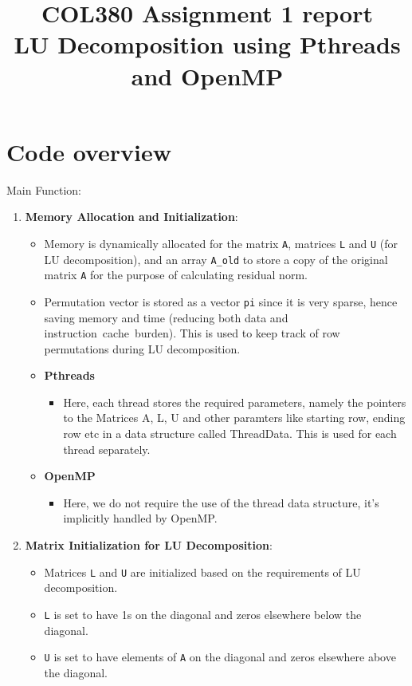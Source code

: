 \documentclass{article}
\title{COL380 Assignment 1 report \\  LU Decomposition using Pthreads and OpenMP}
\author{}
\date{}
\begin{document}
\maketitle

\section{Code overview}

Main Function:

\begin{enumerate}
    \item \textbf{Memory Allocation and Initialization}:
    \begin{itemize}
        \item Memory is dynamically allocated for the matrix \texttt{A}, matrices \texttt{L} and \texttt{U} (for LU decomposition), and an array \texttt{A\_old} to store a copy of the original matrix \texttt{A} for the purpose of calculating residual norm.
		\item Permutation vector is stored as a vector \texttt{pi} since it is very sparse, hence saving memory and time (reducing both data and instruction cache burden). This is used to keep track of row permutations during LU decomposition.
		\item \textbf{Pthreads}
		\begin{itemize}
			\item Here, each thread stores the required parameters, namely the pointers to the Matrices A, L, U and other paramters like starting row, ending row etc in a data structure called ThreadData. This is used for each thread separately.
		\end{itemize}
		\item \textbf{OpenMP}
		\begin{itemize}
			\item Here, we do not require the use of the thread data structure, it's implicitly handled by OpenMP.
		\end{itemize}
    \end{itemize}

    \item \textbf{Matrix Initialization for LU Decomposition}:
    \begin{itemize}
        \item Matrices \texttt{L} and \texttt{U} are initialized based on the requirements of LU decomposition.
        \item \texttt{L} is set to have 1s on the diagonal and zeros elsewhere below the diagonal.
        \item \texttt{U} is set to have elements of \texttt{A} on the diagonal and zeros elsewhere above the diagonal.
    \end{itemize}


\end{enumerate}
\end{document}

